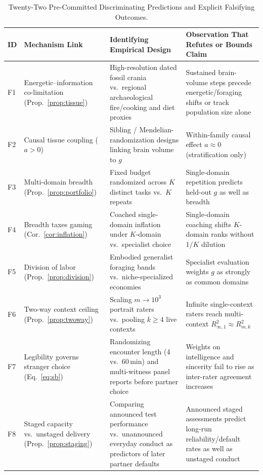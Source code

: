 \begin{table}[!t]
\caption{Twenty-Two Pre-Committed Discriminating Predictions and Explicit Falsifying Outcomes.}\label{tab:falsifiers}
\scriptsize
\renewcommand{\arraystretch}{0.77}
\setlength{\tabcolsep}{3.5pt}
\begin{tabularx}{\textwidth}{@{}l>{\raggedright\arraybackslash}p{}LL@{}}
\toprule
ID & Mechanism Link & Identifying Empirical Design & Observation That Refutes or Bounds Claim \\
\midrule
F1 & Energetic--information co-limitation (Prop.~\ref{prop:tissue}) & High-resolution dated fossil crania vs.\ regional archaeological fire/cooking and diet proxies & Sustained brain-volume steps precede energetic/foraging shifts or track population size alone \\
F2 & Causal tissue coupling ($a>0$) & Sibling / Mendelian-randomization designs linking brain volume to $g$ & Within-family causal effect $a\approx 0$ (stratification only) \\
F3 & Multi-domain breadth (Prop.~\ref{prop:portfolio}) & Fixed budget randomized across $K$ distinct tasks vs.\ $K$ repeats & Single-domain repetition predicts held-out $g$ as well as breadth \\
F4 & Breadth taxes gaming (Cor.~\ref{cor:inflation}) & Coached single-domain inflation under $K$-domain vs.\ specialist choice & Single-domain coaching shifts $K$-domain ranks without $1/K$ dilution \\
F5 & Division of labor (Prop.~\ref{prop:division}) & Embodied generalist foraging bands vs.\ niche-specialized economies & Specialist evaluation weights $g$ as strongly as common domains \\
F6 & Two-way context ceiling (Prop.~\ref{prop:twoway}) & Scaling $m\to 10^3$ portrait raters vs.\ pooling $k\ge 4$ live contexts & Infinite single-context raters reach multi-context $R^2_{\infty,1}\approx R^2_{m,k}$ \\
F7 & Legibility governs stranger choice (Eq.~\eqref{eq:sb}) & Randomizing encounter length (4 vs.\ 60\,min) and multi-witness panel reports before partner choice & Weights on intelligence and sincerity fail to rise as inter-rater agreement increases \\
F8 & Staged capacity vs.\ unstaged delivery (Prop.~\ref{prop:staging}) & Comparing announced test performance vs.\ unannounced everyday conduct as predictors of later partner defaults & Announced staged assessments predict long-run reliability/default rates as well as unstaged conduct \\

\end{tabularx}
\end{table}
